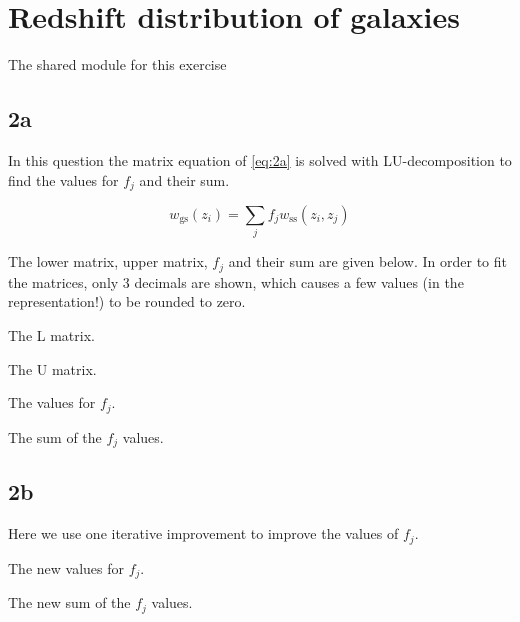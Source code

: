 \section{Redshift distribution of galaxies}

The shared module for this exercise 



\subsection{2a}

In this question the matrix equation of \ref{eq:2a} is solved with LU-decomposition to find the values for $f_{j}$ and their sum. 

\begin{equation}\label{eq:2a}
w_{\mathrm{gs}}\left(z_{i}\right)=\sum_{j} f_{j} w_{\mathrm{ss}}\left(z_{i}, z_{j}\right)
\end{equation}



The lower matrix, upper matrix, $f_{j}$ and their sum are given below. In order to fit the matrices, only 3 decimals are shown, which causes a few values (in the representation!) to be rounded to zero.

The L matrix.


The U matrix.


The values for $f_{j}$.


The sum of the $f_{j}$ values.


\subsection{2b}

Here we use one iterative improvement to improve the values of $f_{j}$. 



The new values for $f_{j}$.


The new sum of the $f_{j}$ values.


